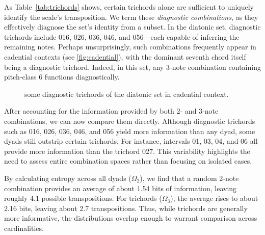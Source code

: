 \documentclass[10pt,twocolumn]{article}
\numberwithin{equation}{section} %
\begin{document}
As Table~\ref{tab:trichords} shows, certain trichords alone are
sufficient to uniquely identify the scale’s transposition. We term these \textit{diagnostic
combinations}, as they effectively diagnose the set’s identity from a
subset. In the diatonic set, diagnostic trichords include 016, 026, 036, 046,
and 056—each capable of inferring the remaining notes. Perhaps unsurprisingly,
such combinations frequently appear in cadential contexts (see \autoref{fig:cadential}), with the dominant seventh chord
itself being a diagnostic trichord. Indeed, in this set, any 3‑note combination containing pitch‑class 6 functions diagnostically.

\begin{figure}[htbp]
\centering
{}
\caption{
some
diagnostic trichords of the diatonic set in cadential context.}
\label{fig:cadential}
\end{figure}

After accounting for the information provided by both 2‑ and
3‑note combinations, we can now compare them directly. Although diagnostic
trichords such as 016, 026, 036, 046, and 056 yield more information than any
dyad, some dyads still outstrip certain trichords. For instance, intervals 01,
03, 04, and 06 all provide more information than the trichord 027. This
variability highlights the need to assess entire combination spaces rather than
focusing on isolated cases.

By calculating entropy across all dyads ($\Omega_2$), we find that a random 2‑note
combination provides an average of about 1.54 bits of information, leaving
roughly 4.1 possible transpositions. For trichords ($\Omega_3$), the average rises to about 2.16 bits,
leaving about 2.7 transpositions. Thus, while trichords are generally more
informative, the distributions overlap enough to warrant comparison across
cardinalities.
\end{document}
